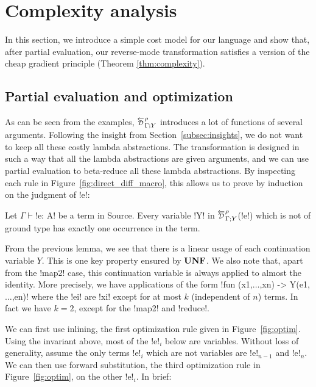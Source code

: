 \section{Complexity analysis}
\label{sec:complexity}

In this section, we introduce a simple cost model for our language and show 
that, after partial evaluation, our reverse-mode transformation satisfies a version of the cheap gradient principle (Theorem \ref{thm:complexity}).

\subsection{Partial evaluation and optimization} %
\label{sub:Partial evaluation and optimization}

As can be seen from the examples, $\directD{\rho}{\Gamma}{Y}$ introduces a lot of functions of several arguments.
Following the insight from Section~\ref{subsec:insights}, we do not want to keep all these costly lambda abstractions.
The transformation is designed in such a way that all the lambda abstractions are given arguments,  
and we can use partial evaluation to beta-reduce all these lambda abstractions. 
By inspecting each rule in Figure~\ref{fig:direct_diff_macro}, this allows us to prove by induction on the judgment of !e!:

\begin{lemma}
    Let $\Gamma \vdash$!e: A! be a term in Source. 
    Every variable !Y! in $\directD{\rho}{\Gamma}{Y}$(!e!) which is not of ground type has exactly one occurrence in the term.
\end{lemma}

From the previous lemma, we see that there is a linear usage of each continuation variable $Y$. 
This is one key property ensured by $\mathbf{UNF}$.
We also note that, apart from the !map2! case, this continuation variable is always applied to almost the identity. 
More precisely, we have applications of the form !fun (x1,$\ldots$,xn) -> Y(e1,$\ldots$,en)! 
where the !ei! are !xi! except for at most $k$ (independent of $n$) terms.
In fact we have $k=2$, except for the !map2! and !reduce!.

We can first use inlining, the first optimization rule given in Figure~\ref{fig:optim}.
Using the invariant above, most of the !e!$_{i}$ below are variables. 
Without loss of generality, assume the only terms !e!$_{i}$ which are not variables are !e!$_{n-1}$ and !e!$_{n}$.
We can then use forward substitution, the third optimization rule in Figure~\ref{fig:optim}, on the other !e!$_{i}$.
In brief:


